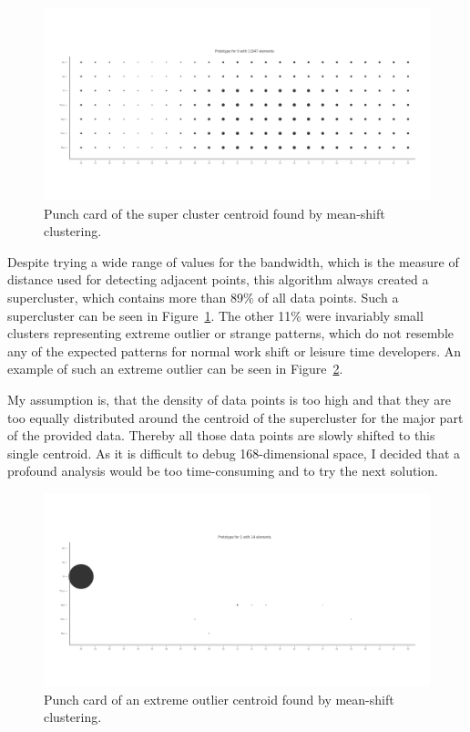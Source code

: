 \begin{figure}[H]
    \includegraphics[scale=0.32]{./graphs/analysis-mean-shift/supercluster}
    \centering
    \caption{Punch card of the super cluster centroid found by mean-shift clustering.}\label{fig:mean-shift-super-cluster}
\end{figure}

Despite trying a wide range of values for the bandwidth, which is the measure of distance used for detecting adjacent points, this algorithm always created a supercluster, which contains more than 89\% of all data points.
Such a supercluster can be seen in Figure~\ref{fig:mean-shift-super-cluster}.
The other 11\% were invariably small clusters representing extreme outlier or strange patterns, which do not resemble any of the expected patterns for normal work shift or leisure time developers.
An example of such an extreme outlier can be seen in Figure~\ref{fig:mean-shift-outlier}.

My assumption is, that the density of data points is too high and that they are too equally distributed around the centroid of the supercluster for the major part of the provided data.
Thereby all those data points are slowly shifted to this single centroid.
As it is difficult to debug 168-dimensional space, I decided that a profound analysis would be too time-consuming and to try the next solution.

\begin{figure}[H]
    \includegraphics[scale=0.32]{./graphs/analysis-mean-shift/outlier}
    \centering
    \caption{Punch card of an extreme outlier centroid found by mean-shift clustering.}\label{fig:mean-shift-outlier}
\end{figure}

